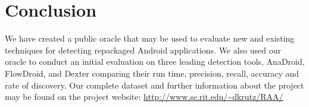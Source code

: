 \documentclass{sig-alternate}
\begin{document}
\section{Conclusion}
\label{sec: conclusion}

We have created a public oracle that may be used to evaluate new and existing techniques for detecting repackaged Android applications. We also used our oracle to conduct an initial evaluation on three leading detection tools, AnaDroid, FlowDroid, and Dexter comparing their run time, precision, recall, accuracy and rate of discovery. Our complete dataset and further information about the project may be found on the project website: \url{http://www.se.rit.edu/~dkrutz/RAA/}

\balance



\end{document}
